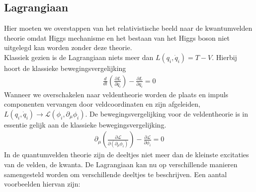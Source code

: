 \documentclass[../main.tex]{subfiles}
\begin{document}
\subsection{Lagrangiaan}%
\label{sub:lagrangiaan}

Hier moeten we overstappen van het relativistische beeld naar de kwantumvelden theorie omdat Higgs mechanisme en het bestaan van het Higgs boson niet uitgelegd kan worden zonder deze theorie.\\
Klassiek gezien is de Lagrangiaan niets meer dan $L(q_i, \dot{q}_i) = T-V$. Hierbij hoort de klassieke bewegingsvergelijking
\begin{equation}
    \begin{aligned}
        \label{eq:klas_bewegingsvergelijking}
        \frac{d}{dt} \left( \frac{\partial L}{\partial \dot{q}_i} \right) - \frac{\partial L}{\partial q_i} =0
    \end{aligned}
\end{equation}
Wanneer we overschakelen naar veldentheorie worden de plaats en impuls componenten vervangen door veldcoordinaten en zijn afgeleiden, $L(q_i,\dot{q}_i) \rightarrow \mathcal{L}(\phi_i, \partial_\mu\phi_i)$. De bewegingsvergelijking voor de veldentheorie is in essentie gelijk aan de klassieke bewegingsvergelijking.
\begin{equation}
    \begin{aligned}
        \label{eq:velden_bewegingsvergelijking}
        \partial_\mu \left( \frac{\partial \mathcal{L}}{\partial(\partial_\mu \phi_i)} \right) - \frac{\partial \mathcal{L}}{\partial \phi_i} = 0
    \end{aligned}
\end{equation}
In de quantumvelden theorie zijn de deeltjes niet meer dan de kleinste excitaties van de velden, de kwanta. De Lagrangiaan kan nu op verschillende manieren samengesteld worden om verschillende deeltjes te beschrijven. Een aantal voorbeelden hiervan zijn:
\end{document}
